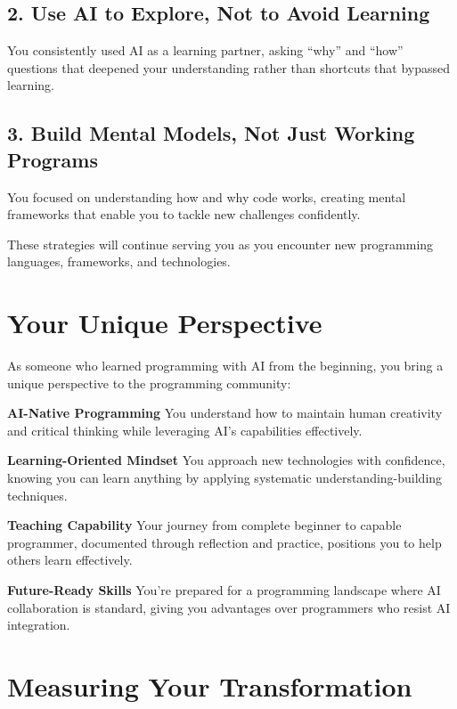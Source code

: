 \documentclass[
  letterpaper,
  DIV=11,
  numbers=noendperiod,
  oneside]{scrreprt}
\begin{document}
\subsection{2. Use AI to Explore, Not to Avoid
Learning}\label{use-ai-to-explore-not-to-avoid-learning}

You consistently used AI as a learning partner, asking ``why'' and
``how'' questions that deepened your understanding rather than shortcuts
that bypassed learning.

\subsection{3. Build Mental Models, Not Just Working
Programs}\label{build-mental-models-not-just-working-programs}

You focused on understanding how and why code works, creating mental
frameworks that enable you to tackle new challenges confidently.

These strategies will continue serving you as you encounter new
programming languages, frameworks, and technologies.

\section{Your Unique Perspective}\label{your-unique-perspective-1}

As someone who learned programming with AI from the beginning, you bring
a unique perspective to the programming community:

\textbf{AI-Native Programming} You understand how to maintain human
creativity and critical thinking while leveraging AI's capabilities
effectively.

\textbf{Learning-Oriented Mindset} You approach new technologies with
confidence, knowing you can learn anything by applying systematic
understanding-building techniques.

\textbf{Teaching Capability} Your journey from complete beginner to
capable programmer, documented through reflection and practice,
positions you to help others learn effectively.

\textbf{Future-Ready Skills} You're prepared for a programming landscape
where AI collaboration is standard, giving you advantages over
programmers who resist AI integration.

\section{Measuring Your
Transformation}\label{measuring-your-transformation}
\end{document}
